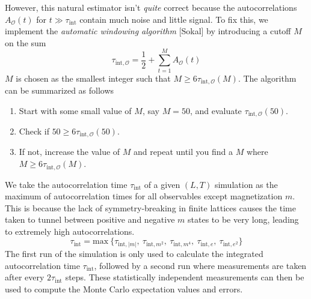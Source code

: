 \documentclass[../thesis_main.tex]{subfiles}
\begin{document}
However, this natural estimator isn't \textit{quite} correct because the autocorrelations $A_\mathcal{O}(t)$ for $t \gg \tau_\text{int}$ contain much noise and little signal. To fix this, we implement the \textit{automatic windowing algorithm} [Sokal] by introducing a cutoff $M$ on the sum
\begin{equation}
    \tau_{\text{int}, \mathcal{O}} = \frac{1}{2} + \sum_{t=1}^{M} A_\mathcal{O}(t)
\end{equation} 
$M$ is chosen as the smallest integer such that $M \geq 6 \tau_{\text{int}, \mathcal{O}}(M)$. The algorithm can be summarized as follows  
\begin{enumerate}
    \setlength{\itemsep}{0.1em}
    \item Start with some small value of $M$, say $M=50$, and evaluate $\tau _{\text{int}, \mathcal{O}}(50)$.
    \item Check if $50 \geq 6\tau _{\text{int}, \mathcal{O}}(50)$.
    \item If not, increase the value of $M$ and repeat until you find a $M$ where $M \geq 6 \tau_{\text{int}, \mathcal{O}}(M)$.           
\end{enumerate}   
We take the autocorrelation time $\tau_\text{int}$ of a given $(L, T)$ simulation as the maximum of autocorrelation times for all observables except magnetization $m$. This is because the lack of symmetry-breaking in finite lattices causes the time taken to tunnel between positive and negative $m$ states to be very long, leading to extremely high autocorrelations. 
\begin{equation}
    \tau _\text{int} = \text{max}\:\{\tau_{\text{int},|m|},\: \tau_{\text{int}, m^2},\: \tau_{\text{int}, m^4},\: \tau_{\text{int}, e},\: \tau_{\text{int}, e^2}\}
\end{equation}
The first run of the simulation is only used to calculate the integrated autocorrelation time $\tau_\text{int}$, followed by a second run where measurements are taken after every $2 \tau_\text{int}$ steps. These statistically independent measurements can then be used to compute the Monte Carlo expectation values and errors.
\end{document}
